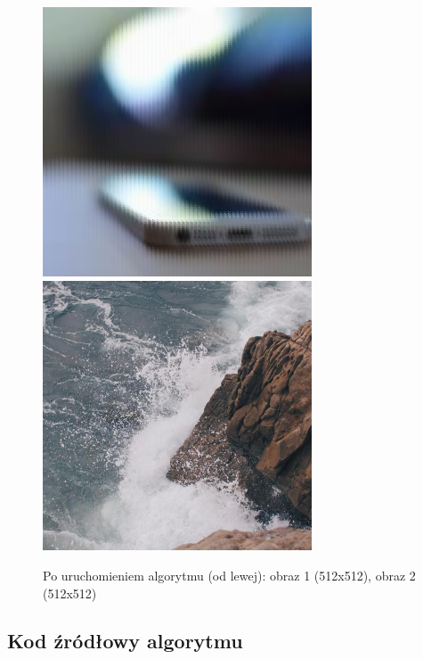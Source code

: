 \documentclass[a4paper,12pt]{book}
\begin{document}
\begin{figure}[H]
	\caption{Po uruchomieniem algorytmu (od lewej): obraz 1 (512x512), obraz 2 (512x512)}
	\includegraphics[width=8cm, height=8cm]{1-4/raster-color-phone-sea.png}
	\includegraphics[width=8cm, height=8cm]{1-4/raster-color-sea-phone.png}
\end{figure}

\subsection*{Kod źródłowy algorytmu}
\end{document}
